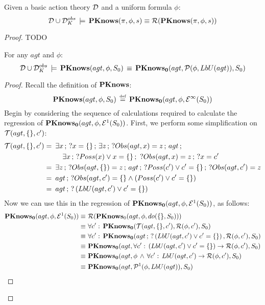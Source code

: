 \begin{thmext}
[{{[}{\ref{thm:Reg_PKnows}}]}] Given a basic action theory $\mathcal{D}$ and a uniform
formula $\phi$:\[
\mathcal{D}\cup\mathcal{D}_{K}^{obs}\,\models\,\mathbf{PKnows}(\pi,\phi,s)\equiv\mathcal{R}(\mathbf{PKnows}(\pi,\phi,s))\]

\end{thmext}
\begin{proof}
TODO
\begin{ned}

\begin{lemmaext}
[{{[}{\ref{thm:Pknows_LbU_S0}}]}] For any $agt$ and $\phi$:\[
\mathcal{D}\cup\mathcal{D}_{K}^{obs}\,\models\,\mathbf{PKnows}(agt,\phi,S_{0})\,\equiv\,\mathbf{PKnows_{0}}(agt,\mathcal{P}(\phi,LbU(agt)),S_{0})\]

\end{lemmaext}
\begin{proof}
Recall the definition of $\mathbf{PKnows}$:\[
\mathbf{PKnows}(agt,\phi,S_{0})\,\stackrel{\mbox{\tiny def}}{=}\,\mathbf{PKnows_{0}}(agt,\phi,\mathcal{E}^{\infty}(S_{0}))\]
 Begin by considering the sequence of calculations required to calculate
the regression of $\mathbf{PKnows_{0}}(agt,\phi,\mathcal{E}^{1}(S_{0}))$. First,
we perform some simplification on $\mathcal{T}(agt,\{\},c')$:\begin{align*}
\mathcal{T}(agt,\{\},c')=\,\,\, & \exists x\,;\,?x=\{\}\,;\,\exists z\,;\,?Obs(agt,x)=z\,;\, agt\,;\\
 & \,\,\,\,\,\,\exists x\,;\,?Poss(x)\vee x=\{\}\,;\,\,?Obs(agt,x)=z\,;\,?x=c'\\
=\,\,\, & \exists z\,;\,?Obs(agt,\{\})=z\,;\, agt\,;\,?Poss(c')\vee c'=\{\}\,;\,?Obs(agt,c')=z\\
=\,\,\, & agt\,;\,?Obs(agt,c')=\{\}\wedge\left(Poss(c')\vee c'=\{\}\right)\\
=\,\,\, & agt\,;\,?\left(LbU(agt,c')\vee c'=\{\}\right)\end{align*}
 Now we can use this in the regression of $\mathbf{PKnows_{0}}(agt,\phi,\mathcal{E}^{1}(S_{0}))$,
as follows: \begin{align*}
\mathbf{PKnows_{0}}(agt,\phi,\mathcal{E}^{1}(S_{0}))\equiv\,\, & \mathcal{R}(\mathbf{PKnows}_{0}(agt,\phi,do(\{\},S_{0})))\\
\equiv\,\, & \forall c':\,\mathbf{PKnows_{0}}(\mathcal{T}(agt,\{\},c'),\mathcal{R}(\phi,c'),S_{0})\\
\equiv\,\, & \forall c':\,\mathbf{PKnows_{0}}(agt\,;\,?\left(LbU(agt,c')\vee c'=\{\}\right),\mathcal{R}(\phi,c'),S_{0})\\
\equiv\,\, & \mathbf{PKnows_{0}}(agt,\forall c':\,\left(LbU(agt,c')\vee c'=\{\}\right)\rightarrow\mathcal{R}(\phi,c'),S_{0})\\
\equiv\,\, & \mathbf{PKnows_{0}}(agt,\phi\,\wedge\,\forall c':\, LbU(agt,c')\rightarrow\mathcal{R}(\phi,c'),S_{0})\\
\equiv\,\, & \mathbf{PKnows_{0}}(agt,\mathcal{P}^{1}(\phi,LbU(agt)),S_{0})\end{align*}



\end{proof}
\end{ned}
\end{proof}
